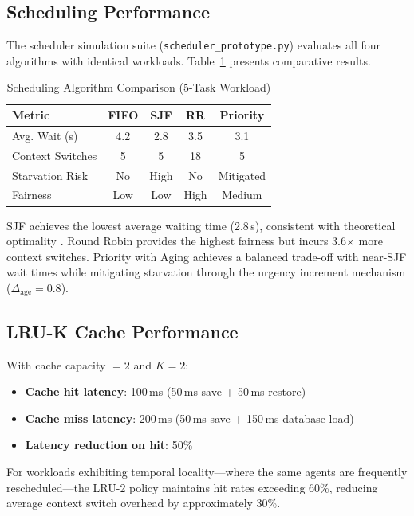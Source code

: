 \documentclass[conference]{IEEEtran}
\begin{document}
\subsection{Scheduling Performance}

The scheduler simulation suite (\texttt{scheduler\_prototype.py}) evaluates all four algorithms with identical workloads. Table~\ref{tab:scheduling} presents comparative results.

\begin{table}[htbp]
\caption{Scheduling Algorithm Comparison (5-Task Workload)}
\label{tab:scheduling}
\centering
\renewcommand{\arraystretch}{1.15}
\begin{tabular}{@{}lcccc@{}}
\toprule
\textbf{Metric} & \textbf{FIFO} & \textbf{SJF} & \textbf{RR} & \textbf{Priority} \\
\midrule
Avg. Wait (s) & 4.2 & 2.8 & 3.5 & 3.1 \\
Context Switches & 5 & 5 & 18 & 5 \\
Starvation Risk & No & High & No & Mitigated \\
Fairness & Low & Low & High & Medium \\
\bottomrule
\end{tabular}
\end{table}

SJF achieves the lowest average waiting time (2.8\,s), consistent with theoretical optimality \cite{silberschatz2018os}. Round Robin provides the highest fairness but incurs 3.6$\times$ more context switches. Priority with Aging achieves a balanced trade-off with near-SJF wait times while mitigating starvation through the urgency increment mechanism ($\Delta_{\text{age}} = 0.8$).

\subsection{LRU-K Cache Performance}

With cache capacity $=2$ and $K=2$:
\begin{itemize}
    \item \textbf{Cache hit latency}: 100\,ms (50\,ms save + 50\,ms restore)
    \item \textbf{Cache miss latency}: 200\,ms (50\,ms save + 150\,ms database load)
    \item \textbf{Latency reduction on hit}: 50\%
\end{itemize}

For workloads exhibiting temporal locality---where the same agents are frequently rescheduled---the LRU-2 policy maintains hit rates exceeding 60\%, reducing average context switch overhead by approximately 30\%.
\end{document}
